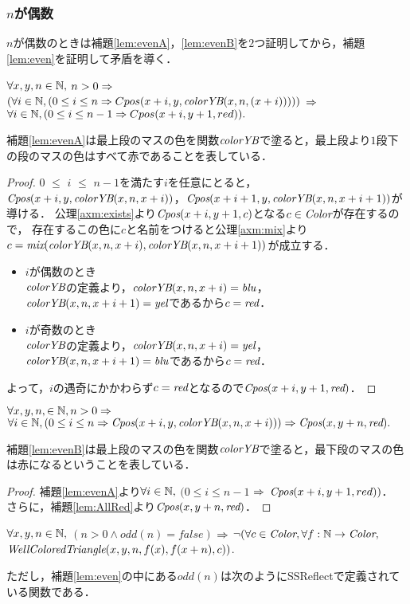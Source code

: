 \subsubsection{$n$が偶数}
$n$が偶数のときは補題\ref{lem:evenA}，\ref{lem:evenB}を$2$つ証明してから，補題\ref{lem:even}を証明して矛盾を導く．
\begin{lem}[\EvenA] \label{lem:evenA}
  $\forall x, y, n \in \mathbb{N},$
  $n > 0 \Rightarrow$
  $(\forall i \in \mathbb{N}, (0 \leq i \leq n \Rightarrow Cpos(x+i,y,\textit{colorYB}(x,n,(x+i)))))$ $\Rightarrow$
  $\forall i \in \mathbb{N}, (0 \leq i \leq n-1 \Rightarrow Cpos(x+i,y+1,red)).$
\end{lem}
補題\ref{lem:evenA}は最上段のマスの色を関数$\textit{colorYB}$で塗ると，最上段より$1$段下の段のマスの色はすべて赤であることを表している．
\begin{proof}
  $0$ $\leq$ $i$ $\leq$ $n-1$を満たす$i$を任意にとると，
  $\textit{Cpos}(x+i,y,\textit{colorYB}(x,n,x+i))$，$\textit{Cpos}(x+i+1,y,\textit{colorYB}(x,n,x+i+1))$が導ける．
  公理\ref{axm:exists}より$\textit{Cpos}(x+i,y+1,c)$となる$c\in\textit{Color}$が存在するので，
  存在するこの色に$c$と名前をつけると公理\ref{axm:mix}より$c=\textit{mix}(\textit{colorYB}(x,n,x+i),\textit{colorYB}(x,n,x+i+1))$が成立する．
  \begin{itemize}
  \item
    $i$が偶数のとき \\
    $\textit{colorYB}$の定義より，$\textit{colorYB}(x,n,x+i)=\textit{blu}$，$\textit{colorYB}(x,n,x+i+1)=\textit{yel}$であるから$c=\textit{red}$．
  \item
    $i$が奇数のとき \\
    $\textit{colorYB}$の定義より，$\textit{colorYB}(x,n,x+i)=\textit{yel}$，$\textit{colorYB}(x,n,x+i+1)=\textit{blu}$であるから$c=\textit{red}$．
  \end{itemize}
  よって，$i$の遇奇にかかわらず$c=\textit{red}$となるので$\textit{Cpos}(x+i,y+1,\textit{red})$．
\end{proof}
\begin{lem}[\EvenB] \label{lem:evenB}
  $\forall x, y, n, \in \mathbb{N}, n > 0 \Rightarrow$
  $\forall i \in \mathbb{N}, (0 \leq i \leq n \Rightarrow \textit{Cpos}(x+i,y,\textit{colorYB}(x,n,x+i))) \Rightarrow \textit{Cpos}(x,y+n,\textit{red}).$
\end{lem}
補題\ref{lem:evenB}は最上段のマスの色を関数$\textit{colorYB}$で塗ると，最下段のマスの色は赤になるということを表している．
\begin{proof}
  補題\ref{lem:evenA}より$\forall i \in \mathbb{N},$ $(0 \leq i \leq n-1$ $\Rightarrow$ $\textit{Cpos}(x+i,y+1,red))$．
  さらに，補題\ref{lem:AllRed}より$\textit{Cpos}(x,y+n,\textit{red})$．
\end{proof}

\begin{lem}[\Even] \label{lem:even}
  $\forall x,y,n \in \mathbb{N},$ 
  $(n > 0 \land odd(n) = false)$ $\Rightarrow$ 
  $\lnot(\forall c \in \textit{Color}, \forall f : \mathbb{N} \to \textit{Color},$
  $\textit{WellColoredTriangle}(x,y,n,f(x),f(x+n),c))$.
\end{lem}
ただし，補題\ref{lem:even}の中にある$odd(n)$は次のようにSSReflectで定義されている関数である．

